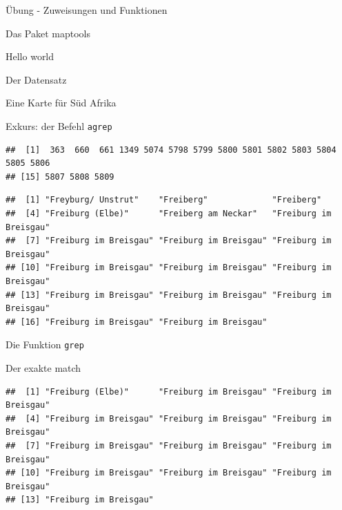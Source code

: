\documentclass[ignorenonframetext,]{beamer}
\newenvironment{Shaded}{\begin{snugshade}}{\end{snugshade}}
\newcommand{\DataTypeTok}[1]{\textcolor[rgb]{0.74,0.68,0.62}{\underline{#1}}}
\newcommand{\KeywordTok}[1]{\textcolor[rgb]{0.26,0.66,0.93}{\textbf{#1}}}
\newcommand{\NormalTok}[1]{\textcolor[rgb]{0.74,0.68,0.62}{#1}}
\newcommand{\OperatorTok}[1]{\textcolor[rgb]{0.74,0.68,0.62}{#1}}
\newcommand{\StringTok}[1]{\textcolor[rgb]{0.02,0.61,0.04}{#1}}
\begin{document}
\begin{frame}[fragile]{Übung - Zuweisungen und Funktionen}
\begin{frame}[fragile]{Das Paket maptools}
\begin{frame}[fragile]{Hello world}
\begin{frame}[fragile]{Der Datensatz}
\begin{frame}[fragile]{Eine Karte für Süd Afrika}
\begin{frame}[fragile]{Exkurs: der Befehl \texttt{agrep}}
\begin{verbatim}
##  [1]  363  660  661 1349 5074 5798 5799 5800 5801 5802 5803 5804 5805 5806
## [15] 5807 5808 5809
\end{verbatim}

\begin{Shaded}
\end{Shaded}

\begin{verbatim}
##  [1] "Freyburg/ Unstrut"    "Freiberg"             "Freiberg"            
##  [4] "Freiburg (Elbe)"      "Freiberg am Neckar"   "Freiburg im Breisgau"
##  [7] "Freiburg im Breisgau" "Freiburg im Breisgau" "Freiburg im Breisgau"
## [10] "Freiburg im Breisgau" "Freiburg im Breisgau" "Freiburg im Breisgau"
## [13] "Freiburg im Breisgau" "Freiburg im Breisgau" "Freiburg im Breisgau"
## [16] "Freiburg im Breisgau" "Freiburg im Breisgau"
\end{verbatim}

\end{frame}

\begin{frame}[fragile]{Die Funktion \texttt{grep}}
\protect\hypertarget{die-funktion-grep}{}

\begin{block}{Der exakte match}

\begin{Shaded}
\end{Shaded}

\begin{verbatim}
##  [1] "Freiburg (Elbe)"      "Freiburg im Breisgau" "Freiburg im Breisgau"
##  [4] "Freiburg im Breisgau" "Freiburg im Breisgau" "Freiburg im Breisgau"
##  [7] "Freiburg im Breisgau" "Freiburg im Breisgau" "Freiburg im Breisgau"
## [10] "Freiburg im Breisgau" "Freiburg im Breisgau" "Freiburg im Breisgau"
## [13] "Freiburg im Breisgau"
\end{verbatim}


\end{block}
\end{frame}
\end{frame}
\end{frame}
\end{frame}
\end{frame}
\end{frame}
\end{document}

